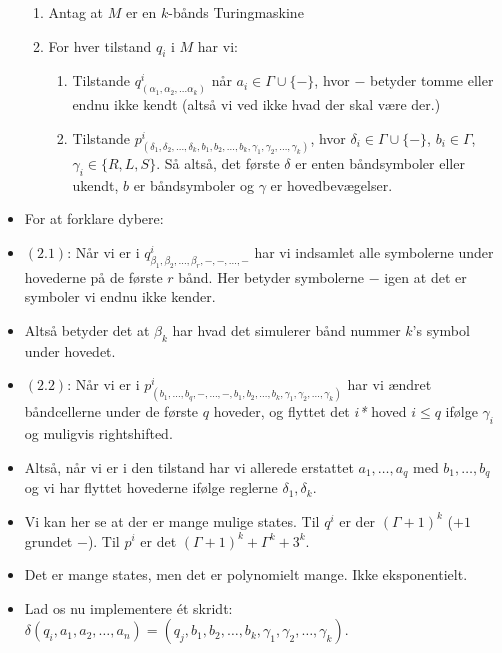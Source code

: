 \begin{frame}[allowframebreaks]
\begin{itemize}
        \begin{enumerate}
          \item Antag at $M$ er en $k$-bånds Turingmaskine
          \item For hver tilstand $q_{i}$ i $M$ har vi:
                \begin{enumerate}
                  \item Tilstande $q^{i}_{(\alpha_{1}, \alpha_{2}, \ldots \alpha_{k})}$ når $a_{i} \in \Gamma \cup \{-\}$, hvor $-$ betyder tomme eller endnu ikke kendt (altså vi ved ikke hvad der skal være der.)
                  \item Tilstande $p^{i}_{(\delta_{1}, \delta_{2}, \ldots, \delta_{k}, b_{1}, b_{2}, \ldots, b_{k}, \gamma_{1}, \gamma_{2}, \ldots, \gamma_{k})}$, hvor $\delta_{i} \in \Gamma \cup \{-\}$, $b_{i} \in \Gamma$, $\gamma_{i} \in \{R,L,S\}$. Så altså, det første \(\delta\) er enten båndsymboler eller ukendt, $b$ er båndsymboler og $\gamma$ er hovedbevægelser.
                \end{enumerate}
        \end{enumerate}
  \item For at forklare dybere:
    \item $(2.1)$: Når vi er i $q_{\beta_{1}, \beta_{2}, \ldots, \beta_{r}, -, -, \ldots, -}^{i}$ har vi indsamlet alle symbolerne under hovederne på de første $r$ bånd. Her betyder symbolerne $-$ igen at det er symboler vi endnu ikke kender.
    \item Altså betyder det at $\beta_{k}$ har hvad det simulerer bånd nummer $k$'s symbol under hovedet.
    \item $(2.2)$: Når vi er i $p^{i}_{(b_{1}, \ldots, b_{q}, -, \ldots, -, b_{1}, b_{2}, \ldots, b_{k}, \gamma_{1}, \gamma_{2}, \ldots, \gamma_{k})}$ har vi ændret båndcellerne under de første $q$ hoveder, og flyttet det $i$\emph{*} hoved $i \le q$ ifølge $\gamma_{i}$ og muligvis rightshifted.
    \item Altså, når vi er i den tilstand har vi allerede erstattet $a_{1}, \ldots, a_{q}$ med $b_{1}, \ldots, b_{q}$ og vi har flyttet hovederne ifølge reglerne $\delta_{1}, \delta_{k}$.
    \item Vi kan her se at der er mange mulige states. Til $q^{i}$ er der $(\Gamma+1)^{k}$ ($+1$ grundet $-$). Til $p^{i}$ er det $(\Gamma+1)^{k}+\Gamma^{k}+3^{k}$.
    \item Det er mange states, men det er polynomielt mange. Ikke eksponentielt.
    \item Lad os nu implementere ét skridt: $\delta(q_{i}, a_{1}, a_{2}, \ldots, a_{n}) = (q_{j}, b_{1}, b_{2}, \ldots, b_{k}, \gamma_{1}, \gamma_{2}, \ldots, \gamma_{k})$.


\end{itemize}
\end{frame}
